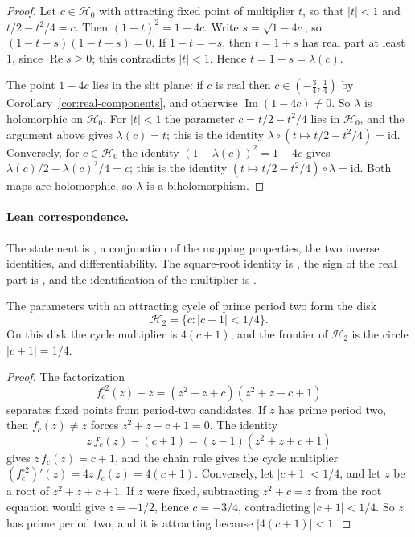 \begin{proof}
Let $c\in\mathcal H_0$ with attracting fixed point of multiplier $t$, so that $|t|<1$ and $t/2-t^2/4=c$.  Then $(1-t)^2=1-4c$.  Write $s=\sqrt{1-4c}$, so $(1-t-s)(1-t+s)=0$.  If $1-t=-s$, then $t=1+s$ has real part at least $1$, since $\operatorname{Re}s\ge0$; this contradicts $|t|<1$.  Hence $t=1-s=\lambda(c)$.

The point $1-4c$ lies in the slit plane: if $c$ is real then $c\in(-\tfrac34,\tfrac14)$ by Corollary~\ref{cor:real-components}, and otherwise $\operatorname{Im}(1-4c)\neq0$.  So $\lambda$ is holomorphic on $\mathcal H_0$.  For $|t|<1$ the parameter $c=t/2-t^2/4$ lies in $\mathcal H_0$, and the argument above gives $\lambda(c)=t$; this is the identity $\lambda\circ(t\mapsto t/2-t^2/4)=\mathrm{id}$.  Conversely, for $c\in\mathcal H_0$ the identity $(1-\lambda(c))^2=1-4c$ gives $\lambda(c)/2-\lambda(c)^2/4=c$; this is the identity $(t\mapsto t/2-t^2/4)\circ\lambda=\mathrm{id}$.  Both maps are holomorphic, so $\lambda$ is a biholomorphism.
\end{proof}

\paragraph{Lean correspondence.}
The statement is
, a conjunction of the mapping properties, the two inverse identities, and differentiability.  The square-root identity is , the sign of the real part is , and the identification of the multiplier is .


\begin{proposition}
\label{prop:period-two-component}
The parameters with an attracting cycle of prime period two form
the disk
\[
 \mathcal H_2=\{c:|c+1|<1/4\}.
\]
On this disk the cycle multiplier is $4(c+1)$, and the frontier of
$\mathcal H_2$ is the circle $|c+1|=1/4$.
\end{proposition}

\begin{proof}
The factorization
\[
 f_c^{\circ2}(z)-z
 =(z^2-z+c)(z^2+z+c+1)
\]
separates fixed points from period-two candidates.  If $z$ has prime
period two, then $f_c(z)\ne z$ forces $z^2+z+c+1=0$.  The identity
\[
 z\,f_c(z)-(c+1)=(z-1)(z^2+z+c+1)
\]
gives $z\,f_c(z)=c+1$, and the chain rule gives the cycle multiplier
$(f_c^{\circ2})'(z)=4z\,f_c(z)=4(c+1)$.
Conversely, let $|c+1|<1/4$, and let $z$ be a root of $z^2+z+c+1$.  If
$z$ were fixed, subtracting $z^2+c=z$ from the root equation would give
$z=-1/2$, hence $c=-3/4$, contradicting $|c+1|<1/4$.  So $z$ has prime
period two, and it is attracting because $|4(c+1)|<1$.
\end{proof}

